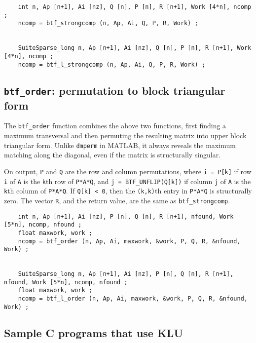 \documentclass[11pt]{article}
\begin{document}
{\footnotesize
\begin{verbatim}
    int n, Ap [n+1], Ai [nz], Q [n], P [n], R [n+1], Work [4*n], ncomp ;
    ncomp = btf_strongcomp (n, Ap, Ai, Q, P, R, Work) ;


    SuiteSparse_long n, Ap [n+1], Ai [nz], Q [n], P [n], R [n+1], Work [4*n], ncomp ;
    ncomp = btf_l_strongcomp (n, Ap, Ai, Q, P, R, Work) ;
\end{verbatim}
}

\subsection{{\tt btf\_order}: permutation to block triangular form}


The {\tt btf\_order} function combines the above two functions, first finding a
maximum transversal and then permuting the resulting matrix into upper block
triangular form.  Unlike {\tt dmperm} in MATLAB, it always reveals the maximum
matching along the diagonal, even if the matrix is structurally singular.

On output, {\tt P} and {\tt Q} are the row and column permutations, where
{\tt i = P[k]} if row {\tt i} of {\tt A} is the {\tt k}th row of {\tt P*A*Q},
and {\tt j = BTF\_UNFLIP(Q[k])} if column {\tt j} of {\tt A} is the {\tt k}th
column of {\tt P*A*Q}.  If {\tt Q[k] < 0}, then the {\tt (k,k)}th entry in
{\tt P*A*Q} is structurally zero.  The vector {\tt R}, and the return value,
are the same as {\tt btf\_strongcomp}.

{\footnotesize
\begin{verbatim}
    int n, Ap [n+1], Ai [nz], P [n], Q [n], R [n+1], nfound, Work [5*n], ncomp, nfound ;
    float maxwork, work ;
    ncomp = btf_order (n, Ap, Ai, maxwork, &work, P, Q, R, &nfound, Work) ;


    SuiteSparse_long n, Ap [n+1], Ai [nz], P [n], Q [n], R [n+1], nfound, Work [5*n], ncomp, nfound ;
    float maxwork, work ;
    ncomp = btf_l_order (n, Ap, Ai, maxwork, &work, P, Q, R, &nfound, Work) ;
\end{verbatim}
}

\subsection{Sample C programs that use KLU}
\end{document}
